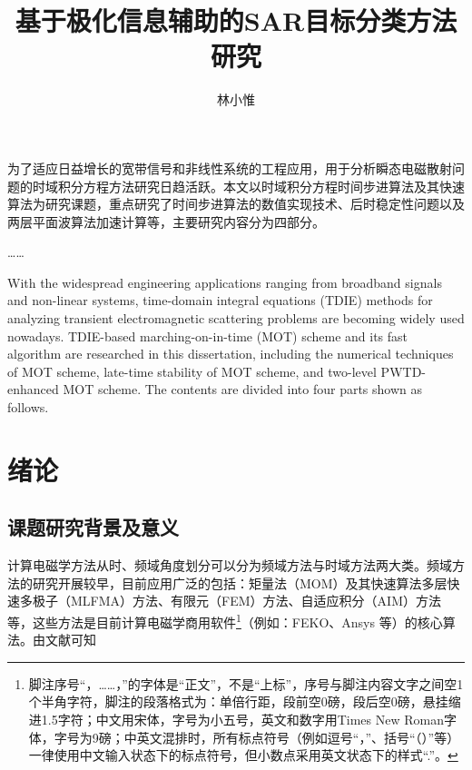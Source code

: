 \documentclass[promaster]{thesis-uestc}
\title{基于极化信息辅助的SAR目标分类方法研究}{Research on SAR target classification method based on polarization information assistance}
\author{林小惟}{Xiaowei Lin}
\begin{document}
\makecover

\begin{chineseabstract}
    为了适应日益增长的宽带信号和非线性系统的工程应用，用于分析瞬态电磁散射问题的时域积分方程方法研究日趋活跃。本文以时域积分方程时间步进算法及其快速算法为研究课题，重点研究了时间步进算法的数值实现技术、后时稳定性问题以及两层平面波算法加速计算等，主要研究内容分为四部分。

    ……

\end{chineseabstract}

\begin{englishabstract}
    With the widespread engineering applications ranging from broadband signals and non-linear systems, time-domain integral equations (TDIE) methods for analyzing transient electromagnetic scattering problems are becoming widely used nowadays. TDIE-based marching-on-in-time (MOT) scheme and its fast algorithm are researched in this dissertation, including the numerical techniques of MOT scheme, late-time stability of MOT scheme, and two-level PWTD-enhanced MOT scheme. The contents are divided into four parts shown as follows.

\end{englishabstract}

\thesistableofcontents

\chapter{绪\hspace{6pt}论}

\section{课题研究背景及意义}

计算电磁学方法从时、频域角度划分可以分为频域方法与时域方法两大类。频域方法的研究开展较早，目前应用广泛的包括：矩量法（MOM）及其快速算法多层快速多极子（MLFMA）方法、有限元（FEM）方法、自适应积分（AIM）方法等，这些方法是目前计算电磁学商用软件\footnote{脚注序号“，……，”的字体是“正文”，不是“上标”，序号与脚注内容文字之间空1个半角字符，脚注的段落格式为：单倍行距，段前空0磅，段后空0磅，悬挂缩进1.5字符；中文用宋体，字号为小五号，英文和数字用Times New Roman字体，字号为9磅；中英文混排时，所有标点符号（例如逗号“，”、括号“（）”等）一律使用中文输入状态下的标点符号，但小数点采用英文状态下的样式“.”。}（例如：FEKO、Ansys 等）的核心算法。由文献\cite{feng997he,clerc2010discrete,xiao2012yi}可知
\end{document}
